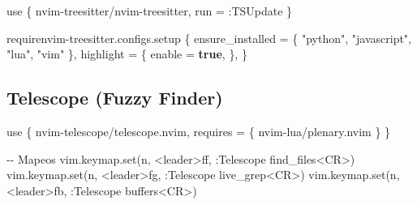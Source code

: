 \documentclass[
  doc,
  floatsintext,
  longtable,
  a4paper,
  nolmodern,
  notxfonts,
  notimes,
  12pt,
  colorlinks=true,linkcolor=blue,citecolor=blue,urlcolor=blue]{apa7}
\newenvironment{Shaded}{\begin{snugshade}}{\end{snugshade}}
\newcommand{\CommentTok}[1]{\textcolor[rgb]{0.37,0.37,0.37}{#1}}
\newcommand{\FunctionTok}[1]{\textcolor[rgb]{0.28,0.35,0.67}{#1}}
\newcommand{\KeywordTok}[1]{\textcolor[rgb]{0.00,0.23,0.31}{\textbf{#1}}}
\newcommand{\NormalTok}[1]{\textcolor[rgb]{0.00,0.23,0.31}{#1}}
\newcommand{\OperatorTok}[1]{\textcolor[rgb]{0.37,0.37,0.37}{#1}}
\newcommand{\StringTok}[1]{\textcolor[rgb]{0.13,0.47,0.30}{#1}}
\newcommand{\VariableTok}[1]{\textcolor[rgb]{0.07,0.07,0.07}{#1}}
\begin{document}
\begin{Shaded}
\begin{Highlighting}[]
\NormalTok{use }\OperatorTok{\{}
    \StringTok{\textquotesingle{}nvim{-}treesitter/nvim{-}treesitter\textquotesingle{}}\OperatorTok{,}
    \VariableTok{run} \OperatorTok{=} \StringTok{\textquotesingle{}:TSUpdate\textquotesingle{}}
\OperatorTok{\}}

\FunctionTok{require}\StringTok{\textquotesingle{}nvim{-}treesitter.configs\textquotesingle{}}\OperatorTok{.}\NormalTok{setup }\OperatorTok{\{}
    \VariableTok{ensure\_installed} \OperatorTok{=} \OperatorTok{\{} \StringTok{"python"}\OperatorTok{,} \StringTok{"javascript"}\OperatorTok{,} \StringTok{"lua"}\OperatorTok{,} \StringTok{"vim"} \OperatorTok{\},}
    \VariableTok{highlight} \OperatorTok{=} \OperatorTok{\{}
        \VariableTok{enable} \OperatorTok{=} \KeywordTok{true}\OperatorTok{,}
    \OperatorTok{\},}
\OperatorTok{\}}
\end{Highlighting}
\end{Shaded}

\subsection{Telescope (Fuzzy Finder)}\label{telescope-fuzzy-finder}

\begin{Shaded}
\begin{Highlighting}[]
\NormalTok{use }\OperatorTok{\{}
    \StringTok{\textquotesingle{}nvim{-}telescope/telescope.nvim\textquotesingle{}}\OperatorTok{,}
    \VariableTok{requires} \OperatorTok{=} \OperatorTok{\{} \StringTok{\textquotesingle{}nvim{-}lua/plenary.nvim\textquotesingle{}} \OperatorTok{\}}
\OperatorTok{\}}

\CommentTok{{-}{-} Mapeos}
\VariableTok{vim}\OperatorTok{.}\VariableTok{keymap}\OperatorTok{.}\NormalTok{set}\OperatorTok{(}\StringTok{\textquotesingle{}n\textquotesingle{}}\OperatorTok{,} \StringTok{\textquotesingle{}\textless{}leader\textgreater{}ff\textquotesingle{}}\OperatorTok{,} \StringTok{\textquotesingle{}:Telescope find\_files\textless{}CR\textgreater{}\textquotesingle{}}\OperatorTok{)}
\VariableTok{vim}\OperatorTok{.}\VariableTok{keymap}\OperatorTok{.}\NormalTok{set}\OperatorTok{(}\StringTok{\textquotesingle{}n\textquotesingle{}}\OperatorTok{,} \StringTok{\textquotesingle{}\textless{}leader\textgreater{}fg\textquotesingle{}}\OperatorTok{,} \StringTok{\textquotesingle{}:Telescope live\_grep\textless{}CR\textgreater{}\textquotesingle{}}\OperatorTok{)}
\VariableTok{vim}\OperatorTok{.}\VariableTok{keymap}\OperatorTok{.}\NormalTok{set}\OperatorTok{(}\StringTok{\textquotesingle{}n\textquotesingle{}}\OperatorTok{,} \StringTok{\textquotesingle{}\textless{}leader\textgreater{}fb\textquotesingle{}}\OperatorTok{,} \StringTok{\textquotesingle{}:Telescope buffers\textless{}CR\textgreater{}\textquotesingle{}}\OperatorTok{)}
\end{Highlighting}
\end{Shaded}
\end{document}
